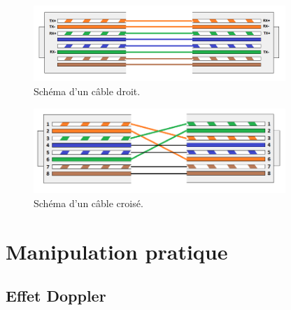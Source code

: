 \documentclass[a4paper]{article}
\begin{document}
\begin{center}
    \begin{figure}[H]
        \centering
        \includegraphics[width=0.85\textwidth]{cable-droit.png}
        \caption{Schéma d'un câble droit.}
        \label{fig:cableDroit}
    \end{figure}
    
    \begin{figure}[H]
        \centering
        \includegraphics[width=0.85\textwidth]{cable-croise.png}
        \caption{Schéma d'un câble croisé.}
        \label{fig:cableCroise}
    \end{figure}
\end{center}















\section{Manipulation pratique}










\subsection{Effet Doppler}
\end{document}
